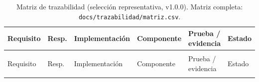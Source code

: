 \begin{landscape}
\small
\begin{longtable}{@{}
  >{\raggedright\arraybackslash}p{2.0cm}
  >{\raggedright\arraybackslash}p{1.8cm}
  >{\raggedright\arraybackslash}p{5.4cm}
  >{\raggedright\arraybackslash}p{4.6cm}
  >{\raggedright\arraybackslash}p{6.4cm}
  >{\raggedright\arraybackslash}p{2.2cm}
@{}}
\caption{Matriz de trazabilidad (selecci\'on representativa, v1.0.0). Matriz completa: \texttt{docs/trazabilidad/matriz.csv}.}
\label{tab:trazabilidad-final} \\
\toprule
Requisito & Resp. & Implementaci\'on & Componente & Prueba / evidencia & Estado \\
\midrule
\endfirsthead
\multicolumn{6}{c}{\tablename\ \thetable\ -- continuaci\'on} \\
\toprule
Requisito & Resp. & Implementaci\'on & Componente & Prueba / evidencia & Estado \\
\midrule
\endhead
\bottomrule
\endfoot


\end{longtable}
\end{landscape}

